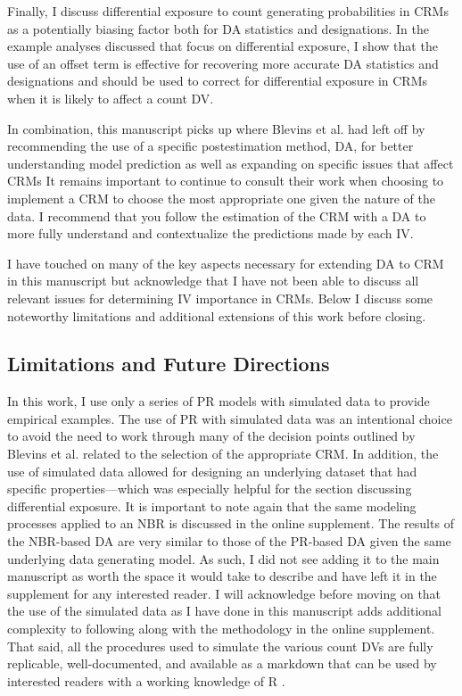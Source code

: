 \documentclass[ShortAfour,times,sageapa]{sagej}
\begin{document}
	Finally, I discuss differential exposure to count generating probabilities in CRMs as a potentially biasing factor both for DA statistics and designations.
	In the example analyses discussed that focus on differential exposure, I show that the use of an offset term is effective for recovering more accurate DA statistics and designations and should be used to correct for differential exposure in CRMs when it is likely to affect a count DV.
	
	In combination, this manuscript picks up where Blevins et al. \citeyear{blevins2015count} had left off by recommending the use of a specific postestimation method, DA, for better understanding model prediction as well as expanding on specific issues that affect CRMs
	It remains important to continue to consult their work when choosing to implement a CRM to choose the most appropriate one given the nature of the data.
	I recommend that you follow the estimation of the CRM with a DA to more fully understand and contextualize the predictions made by each IV.
	
	I have touched on many of the key aspects necessary for extending DA to CRM in this manuscript but acknowledge that I have not been able to discuss all relevant issues for determining IV importance in CRMs.
	Below I discuss some noteworthy limitations and additional extensions of this work before closing.
	
	\subsection{Limitations and Future Directions}
	
	In this work, I use only a series of PR models with simulated data to provide empirical examples.
	The use of PR with simulated data was an intentional choice to avoid the need to work through many of the decision points outlined by Blevins et al. \citeyear{blevins2015count} related to the selection of the appropriate CRM.
	In addition, the use of simulated data allowed for designing an underlying dataset that had specific properties---which was especially helpful for the section discussing differential exposure.
	It is important to note again that the same modeling processes applied to an NBR is discussed in the online supplement.
	The results of the NBR-based DA are very similar to those of the PR-based DA given the same underlying data generating model.
	As such, I did not see adding it to the main manuscript as worth the space it would take to describe and have left it in the supplement for any interested reader.
	I will acknowledge before moving on that the use of the simulated data as I have done in this manuscript adds additional complexity to following along with the methodology in the online supplement.
	That said, all the procedures used to simulate the various count DVs are fully replicable, well-documented, and available as a markdown that can be used by interested readers with a working knowledge of R \cite{R}.
	
\end{document}
